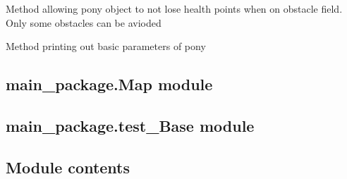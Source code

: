 \documentclass[letterpaper,10pt,english]{sphinxmanual}
\begin{document}
\begin{fulllineitems}
\begin{quote}
\begin{description}
\begin{itemize}
\end{itemize}

\end{description}\end{quote}

\begin{fulllineitems}
\label{\detokenize{main_package:main_package.Horse.Pony.sneak_obstacle}}
\pysigstartsignatures
{}
\pysigstopsignatures
\sphinxAtStartPar
Method allowing pony object to not lose health points when on obstacle field. Only some obstacles can be
avioded

\end{fulllineitems}


\begin{fulllineitems}
\label{\detokenize{main_package:main_package.Horse.Pony.stats}}
\pysigstartsignatures
{}
\pysigstopsignatures
\sphinxAtStartPar
Method printing out basic parameters of pony

\end{fulllineitems}


\end{fulllineitems}



\subsection{main\_package.Map module}
\label{\detokenize{main_package:main-package-map-module}}

\subsection{main\_package.test\_Base module}
\label{\detokenize{main_package:main-package-test-base-module}}

\subsection{Module contents}
\label{\detokenize{main_package:module-main_package}}\label{\detokenize{main_package:module-contents}}
\end{document}
